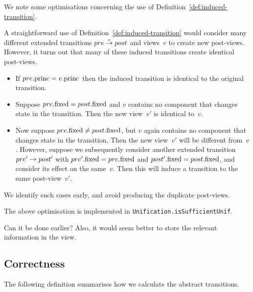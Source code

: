We note some optimisations concerning the use of
Definition~\ref{def:induced-transition}.  
%
\begin{opt}
\label{opt:avoid-induced}
A straightforward use of Definition~\ref{def:induced-transition} would
consider many different extended transitions $pre \stackrel{e}\rightarrow post$ and
views~$v$ to create new post-views.  However, it turns out that many of these
induced transitions create identical post-views.
%
\begin{itemize}
\item If $pre.\mathrm{princ} = v.\mathrm{princ}$ then the induced transition is identical to the
  original transition. %

\item Suppose $pre.\mathrm{fixed} = post.\mathrm{fixed}$ and $v$ contains no component that
  changes state in the transition.  Then the new view~$v'$ is identical
  to~$v$. 

\item Now suppose $pre.\mathrm{fixed} \ne post.\mathrm{fixed}$, but $v$ again contains no
  component that changes state in the transition.  Then the new view~$v'$ will
  be different from~$v$.  However, suppose we subsequently consider another
  extended transition $pre' \stackrel{}\rightarrow post'$ with $pre'.\mathrm{fixed} = pre.\mathrm{fixed}$
  and $post'.\mathrm{fixed} = post.\mathrm{fixed}$, and consider its effect on the same~$v$.
  Then this will induce a transition to the same post-view~$v'$.   
\end{itemize}

We identify such cases early, and avoid producing the duplicate post-views. 
\end{opt}

\begin{impNote}
The above optimisation is implemented in
\texttt{Unification.isSufficientUnif}.  
\end{impNote}

\begin{improve}
Can it be done earlier?  Also, it would seem better to store the relevant
information in the view.
\end{improve}



\subsection{Correctness}
\label{sec:views-correctness}


The following definition summarises how we calculate the abstract transitions.

